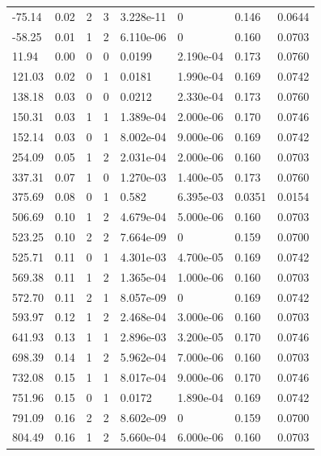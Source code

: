 \documentclass[preview]{standalone}
\begin{document}
{{\begin{tabular}{L{1.2cm}C{1.2cm} C{0.3cm}C{0.5cm} C{1.4cm}C{1.4cm} C{1.4cm}C{1.4cm}}
  -75.14  &  0.02  & 2     &  3 &  3.228e-11  & 0  & 0.146 &  0.0644   \\ 
  -58.25  &  0.01  & 1     &  2 &  6.110e-06  & 0  & 0.160 &  0.0703   \\ 
  11.94  &  0.00  & 0     &  0 &  0.0199  & 2.190e-04  & 0.173 &  0.0760   \\ 
  121.03  &  0.02  & 0     &  1 &  0.0181  & 1.990e-04  & 0.169 &  0.0742   \\ 
  138.18  &  0.03  & 0     &  0 &  0.0212  & 2.330e-04  & 0.173 &  0.0760   \\ 
  150.31  &  0.03  & 1     &  1 &  1.389e-04  & 2.000e-06  & 0.170 &  0.0746   \\ 
  152.14  &  0.03  & 0     &  1 &  8.002e-04  & 9.000e-06  & 0.169 &  0.0742   \\ 
  254.09  &  0.05  & 1     &  2 &  2.031e-04  & 2.000e-06  & 0.160 &  0.0703   \\ 
  337.31  &  0.07  & 1     &  0 &  1.270e-03  & 1.400e-05  & 0.173 &  0.0760   \\ 
  375.69  &  0.08  & 0     &  1 &  0.582  & 6.395e-03  & 0.0351 &  0.0154   \\ 
  506.69  &  0.10  & 1     &  2 &  4.679e-04  & 5.000e-06  & 0.160 &  0.0703   \\ 
  523.25  &  0.10  & 2     &  2 &  7.664e-09  & 0  & 0.159 &  0.0700   \\ 
  525.71  &  0.11  & 0     &  1 &  4.301e-03  & 4.700e-05  & 0.169 &  0.0742   \\ 
  569.38  &  0.11  & 1     &  2 &  1.365e-04  & 1.000e-06  & 0.160 &  0.0703   \\ 
  572.70  &  0.11  & 2     &  1 &  8.057e-09  & 0  & 0.169 &  0.0742   \\ 
  593.97  &  0.12  & 1     &  2 &  2.468e-04  & 3.000e-06  & 0.160 &  0.0703   \\ 
  641.93  &  0.13  & 1     &  1 &  2.896e-03  & 3.200e-05  & 0.170 &  0.0746   \\ 
  698.39  &  0.14  & 1     &  2 &  5.962e-04  & 7.000e-06  & 0.160 &  0.0703   \\ 
  732.08  &  0.15  & 1     &  1 &  8.017e-04  & 9.000e-06  & 0.170 &  0.0746   \\ 
  751.96  &  0.15  & 0     &  1 &  0.0172  & 1.890e-04  & 0.169 &  0.0742   \\ 
  791.09  &  0.16  & 2     &  2 &  8.602e-09  & 0  & 0.159 &  0.0700   \\ 
  804.49  &  0.16  & 1     &  2 &  5.660e-04  & 6.000e-06  & 0.160 &  0.0703   \\ 

\end{tabular}}}
\end{document}
